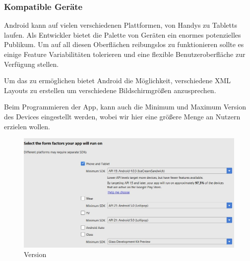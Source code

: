 \subsubsection{Kompatible Geräte}
\label{subsec:device-compability}

Android kann auf vielen verschiedenen Plattformen, von Handys zu Tabletts laufen.
Als Entwickler bietet die Palette von Geräten ein enormes potenzielles Publikum.
Um auf all diesen Oberflächen reibungslos zu funktionieren sollte es einige Feature Variabilitäten tolerieren und eine 
flexible Benutzeroberfläche zur Verfügung stellen. 

Um das zu ermöglichen bietet Android die Möglichkeit, verschiedene XML Layouts zu erstellen um verschiedene Bildschirmgrößen anzusprechen.

Beim Programmieren der App, kann auch die Minimum und Maximum Version des Devices eingestellt werden, wobei wir hier eine größere Menge an Nutzern erzielen wollen. 

\begin{figure}[!htb]\centering
	\includegraphics[width=1.0 \textwidth]{images/MinMaxVers}
	\caption{Version}\label{Fig:Version}
\end{figure}



\clearpage %
